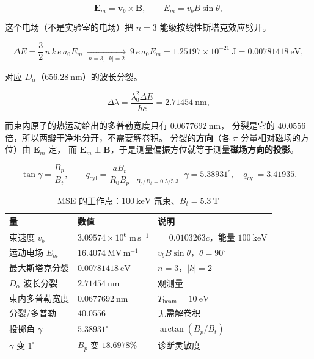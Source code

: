 \begin{equation}
\mathbf{E}_m=\mathbf{v}_b\times\mathbf{B},
\qquad
E_m=v_bB\sin\theta,
\label{eq:app-an-em}
\end{equation}

这个电场（不是实验室的电场）把 $n=3$ 能级按线性斯塔克效应劈开。

\begin{equation}
\Delta E=\frac{3}{2}\,n\,k\,e\,a_0E_m
\ \xrightarrow[\ n=3,\ |k|=2\ ]{}\ 9\,e\,a_0E_m
=1.25197\times10^{-21}\ \mathrm{J}=0.00781418\ \mathrm{eV},
\label{eq:app-an-stark}
\end{equation}

对应 $D_\alpha$（$656.28\ \mathrm{nm}$）的波长分裂。

\begin{equation}
\Delta\lambda=\frac{\lambda_0^2\Delta E}{hc}=2.71454\ \mathrm{nm},
\label{eq:app-an-split}
\end{equation}

而束内原子的热运动给出的多普勒宽度只有 $0.0677692\ \mathrm{nm}$，
分裂是它的 $40.0556$ 倍，所以两瓣干净地分开，不需要解卷积。
分裂的\textbf{方向}（各 $\pi$ 分量相对磁场的方位）由 $\mathbf{E}_m$ 定，
而 $\mathbf{E}_m\perp\mathbf{B}$，于是测量偏振方位就等于测量\textbf{磁场方向的投影}。

\begin{equation}
\tan\gamma=\frac{B_p}{B_t},
\qquad
q_{\mathrm{cyl}}=\frac{aB_t}{R_0B_p}
\ \xrightarrow[\ B_p/B_t=0.5/5.3\ ]{}\ \gamma=5.38931^\circ,\quad q_{\mathrm{cyl}}=3.41935 .
\label{eq:app-an-pitch}
\end{equation}

\begin{table}[htbp]
\centering
\caption{MSE 的工作点：$100\ \mathrm{keV}$ 氘束、$B_t=5.3\ \mathrm{T}$}
\label{tab:app-an-mse}
\small
\begin{tabular}{p{4.2cm} p{3.4cm} p{5.8cm}}
\toprule
量 & 数值 & 说明 \\
\midrule
束速度 $v_b$ & $3.09574\times10^{6}\ \mathrm{m\,s^{-1}}$ & $=0.0103263c$，能量 $100\ \mathrm{keV}$ \\
运动电场 $E_m$ & $16.4074\ \mathrm{MV\,m^{-1}}$ & $v_bB\sin\theta$，$\theta=90^\circ$ \\
最大斯塔克分裂 & $0.00781418\ \mathrm{eV}$ & $n=3$，$|k|=2$ \\
$D_\alpha$ 波长分裂 & $2.71454\ \mathrm{nm}$ & 观测量 \\
束内多普勒宽度 & $0.0677692\ \mathrm{nm}$ & $T_{\mathrm{beam}}=10\ \mathrm{eV}$ \\
分裂/多普勒 & $40.0556$ & 无需解卷积 \\
投掷角 $\gamma$ & $5.38931^\circ$ & $\arctan(B_p/B_t)$ \\
$\gamma$ 变 $1^\circ$ & $B_p$ 变 $18.6978\%$ & 诊断灵敏度 \\
\bottomrule
\end{tabular}
\end{table}

